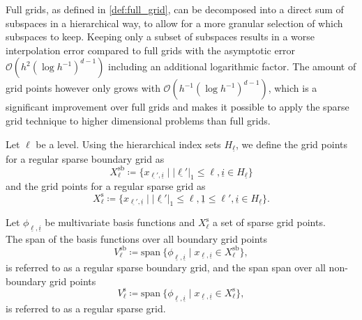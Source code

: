 \documentclass[
  a4paper,  %
  twoside,  %
  bibliography=totoc,
  headsepline,
  cleardoublepage=empty,
  parskip=half,
  draft=false
]{scrbook}
\begin{document}
Full grids, as defined in \cref{def:full_grid}, can be decomposed into a direct sum of subspaces in a hierarchical way, to allow for a more granular selection of which subspaces to keep.
Keeping only a subset of subspaces results in a worse interpolation error compared to full grids with the asymptotic error $\mathcal{O}(h^2 (\log h^{-1})^{d-1})$ including an additional logarithmic factor.
The amount of grid points however only grows with $\mathcal{O}(h^{-1} (\log h^{-1})^{d-1})$, which is a significant improvement over full grids and makes it possible to apply the sparse grid technique to higher dimensional problems than full grids.
\begin{definition}
Let $\ell$ be a level. Using the hierarchical index sets $H_{\underline{\ell}}$, we define the grid points for a regular sparse boundary grid as
\begin{equation}
X^{\text{sb}}_{\ell} \coloneqq \{x_{\underline{\ell'},\underline{i}} \mid |\underline{\ell'}|_1 \leq \ell, \underline{i} \in H_{\underline{\ell}}\}
\end{equation}
and the grid points for a regular sparse grid as
\begin{equation}
X^{\text{s}}_{\ell} \coloneqq \{x_{\underline{\ell'},\underline{i}} \mid |\underline{\ell'}|_1 \leq \ell, \underline{1} \leq \ell', \underline{i} \in H_{\underline{\ell}}\}.
\end{equation}
\end{definition}

\begin{definition}
Let $\phi_{\underline{\ell},\underline{i}}$ be multivariate basis functions and $X^{\text{s}}_{\ell}$ a set of sparse grid points.\\
The span of the basis functions over all boundary grid points
\begin{equation}
V^{\text{sb}}_{\ell} \coloneqq \text{span}~ \{\phi_{\underline{\ell},\underline{i}} \mid x_{\underline{\ell},\underline{i}} \in X^{\text{sb}}_{\ell}\},
\end{equation}
is referred to as a regular sparse boundary grid, and the span span over all non-boundary grid points
\begin{equation}
V^{\text{s}}_{\ell} \coloneqq \text{span}~ \{\phi_{\underline{\ell},\underline{i}} \mid x_{\underline{\ell},\underline{i}} \in X^{\text{s}}_{\ell}\},
\end{equation}
is referred to as a regular sparse grid.
\label{def:sparse_grid}
\end{definition}
\end{document}
